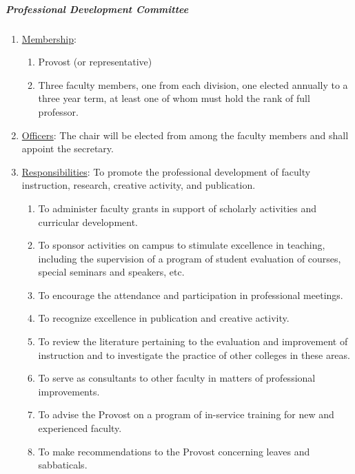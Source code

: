 				\subparagraph{Professional Development Committee}
					\begin{enumerate}[label=\alph*)]
						\item{\underline{Membership}:
							\begin{enumerate}[label=\arabic*)]
								\item{Provost (or representative)}
								\item{Three faculty members, one from each division, one elected annually to a three year term, at least one of whom must hold the rank of full professor.}
							\end{enumerate}
						}
						\item{\underline{Officers}:
							The chair will be elected from among the faculty members and shall appoint the secretary.}
						\item{\underline{Responsibilities}:
							To promote the professional development of faculty instruction, research, creative activity, and publication.
							\begin{enumerate}[label=\arabic*)]
								\item{To administer faculty grants in support of scholarly activities and curricular development.}
								\item{To sponsor activities on campus to stimulate excellence in teaching, including the supervision of a program of student evaluation of courses, special seminars and speakers, etc.}
								\item{To encourage the attendance and participation in professional meetings.}
								\item{To recognize excellence in publication and creative activity.}
								\item{To review the literature pertaining to the evaluation and improvement of instruction and to investigate the practice of other colleges in these areas.}
								\item{To serve as consultants to other faculty in matters of professional improvements.}
								\item{To advise the Provost on a program of in-service training for new and experienced faculty.}
								\item{To make recommendations to the Provost concerning leaves and sabbaticals.}
							\end{enumerate}
						}
					\end{enumerate}
